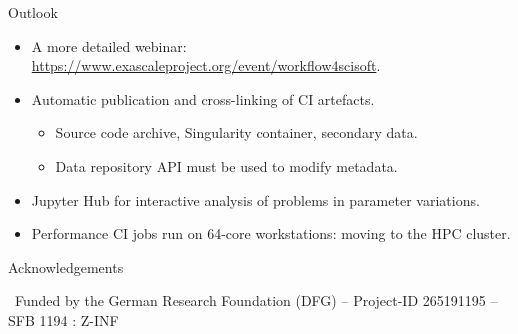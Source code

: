 \documentclass[
	ngerman,%
	aspectratio=169,%
	color={accentcolor=2d},
	logo=true,%
	colorframetitle=true,%
	]{tudabeamer}
\begin{document}
\begin{frame}{Outlook}
	\vfill
	\begin{itemize}

                \item A more detailed webinar: \href{https://www.exascaleproject.org/event/workflow4scisoft}{https://www.exascaleproject.org/event/workflow4scisoft}.


		\item Automatic publication and cross-linking of CI artefacts. 
			\begin{itemize}
				\item Source code archive, Singularity container, secondary data. 
				\item Data repository API must be used to modify metadata. 
			\end{itemize}
		\item Jupyter Hub for interactive analysis of problems in parameter variations.
		\item Performance CI jobs run on 64-core workstations: moving to the HPC cluster. 
	\end{itemize}
\end{frame}

\begin{frame}{Acknowledgements}

	\vfill
	{\
		Funded by the German Research Foundation (DFG) – Project-ID 265191195 – SFB 1194 : Z-INF
	}

\end{frame}
\end{document}
